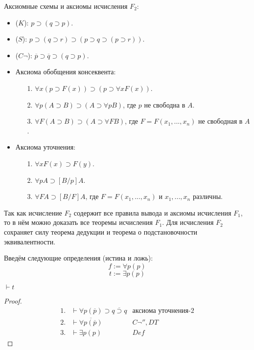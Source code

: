 Аксиомные схемы и аксиомы исчисления $F_2$:
\begin{itemize}
    \item ($K$): $p \supset (q \supset p)$.
    \item ($S$): $p \supset (q \supset r) \supset (p \supset q \supset (p \supset r))$.
    \item ($C\lnot$): $\overline{p} \supset \overline{q} \supset (q \supset p)$.
    \item Аксиома обобщения консеквента: \begin{itemize}
        \item[1.] $\forall x (p \supset F(x)) \supset (p \supset \forall x F(x))$.
        \item[2.] $\forall p (A \supset B) \supset (A \supset \forall p B)$, где $p$ не свободна в $A$.
        \item[3.] $\forall F (A \supset B) \supset (A \supset \forall F B)$, где $F=F(x_1,...,x_n)$ не свободная в $A$.
    \end{itemize}
    \item Аксиома уточнения: \begin{itemize}
        \item[1.] $\forall x F(x)\supset F(y)$.
        \item[2.] $\forall p A \supset [B/p]A$.
        \item[3.] $\forall F A \supset [B/F]A$, где $F=F(x_1,...,x_n)$ и $x_1,...,x_n$ различны.
    \end{itemize}
\end{itemize}

Так как исчисление $F_2$ содержит все правила вывода и аксиомы исчисления $F_1$, то в нём можно доказать все теоремы исчисления $F_1$. Для исчисления $F_2$ сохраняет силу теорема дедукции и теорема о подстановочности эквивалентности.

Введём следующие определения (истина и ложь):
\begin{equation*}
    f := \forall p (p)
\end{equation*}
\begin{equation*}
    t := \exists p (p)
\end{equation*}

\begin{propthm}
    $\vdash t$
\end{propthm}
\begin{proof}
    \begin{equation*}
        \begin{array}{lll}
            1. & \vdash \forall p (\overline{p}) \supset \overline{q \supset q} & \text{аксиома уточнения-2} \\ 
            2. & \vdash \overline{\forall p (\overline{p})} & C\lnot'', DT \\ 
            3. & \vdash \exists p (p) & Def
        \end{array}
    \end{equation*}
\end{proof}